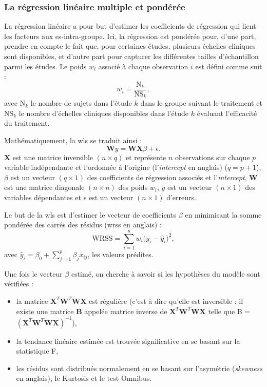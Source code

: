 \subsubsection{La régression linéaire multiple et pondérée}
La régression linéaire a pour but d'estimer les coefficients de régression qui lient les facteurs aux \gls{es}-intra-groupe. Ici, la régression est pondérée pour, d'une part, 
prendre en compte le fait que, pour certaines études, plusieurs échelles cliniques sont disponibles, et d'autre part pour capturer les différentes tailles d'échantillon parmi les études.
Le poids $w_{i}$ associé à chaque observation $i$ est défini comme suit : 
\begin{equation}
\label{eq:weight_WLS}
w_{i} = \frac{\text{N}_{k}}{\text{NS}_{k}},
\end{equation} 
avec $\text{N}_{k}$  le nombre de sujets dans l'étude $k$ dans le groupe suivant le traitement et $\text{NS}_{k}$  le nombre 
d'échelles cliniques disponibles dans l'étude $k$ évaluant l'efficacité du traitement.

Mathématiquement, la \gls{wls} se traduit ainsi : 
\begin{equation}
\label{eq:factors_model_WLS}
\textbf{W}y = \textbf{WX}\beta + \epsilon.
\end{equation}
$\textbf{X}$ est une matrice inversible $(n \times q)$ et représente $n$ observations sur chaque $p$ variable indépendante et l'ordonnée à l'origine (l'\textit{intercept} en anglais) 
($q = p + 1$), 
$\beta$ est un vecteur $(q \times 1)$ des coefficients de régression associés et l'\textit{intercept}, $\textbf{W}$ est une matrice diagonale $(n \times n)$  
des poids $w_{i}$, $y$ est un vecteur $(n \times 1)$ des variables dépendantes et $\epsilon$ est un vecteur $(n \times 1)$ d'erreurs.

Le but de la \gls{wls} est d'estimer le vecteur de coefficients $\beta$ en minimisant la somme pondérée des carrés des résidus (\gls{wrss} en anglais) :
\begin{equation}
\label{eq:factors_WRSS}
\text{WRSS} = \sum_{i=1}^{n} w_i \Big(y_i - \hat{y}_i\Big)^2, 
\end{equation}
avec $\hat{y}_i = \beta_{0} + \sum_{j=1}^{p}\beta_{j}x_{ij}$, les valeurs prédites.

Une fois le vecteur $\beta$ estimé, on cherche à savoir si les hypothèses du modèle sont vérifiées : 
\begin{itemize}
    \item la matrice ${\textbf{X}}^{T}\textbf{W}^{T}\textbf{WX}$ est régulière (c'est à dire qu'elle est inversible : il existe une matrice \textbf{B} appelée matrice inverse de 
		${\textbf{X}}^{T}\textbf{W}^{T}\textbf{WX}$ telle que B = $({\textbf{X}}^{T}\textbf{W}^{T}\textbf{WX})^{-1}$),
    \item la tendance linéaire estimée est trouvée significative en se basant sur la statistique F,
    \item les résidus sont distribués normalement en se basant sur l'asymétrie (\textit{skewness} en anglais), le Kurtosis et le test Omnibus.
\end{itemize} 

